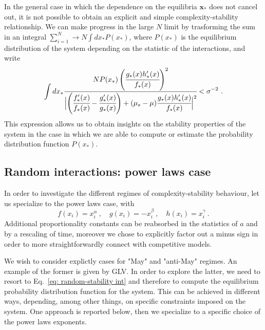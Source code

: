 \documentclass[
 reprint,
 amsmath,amssymb,
 aps,
]{revtex4-2}
\begin{document}
In the general case in which the dependence on the equilibria
$\mathbf{x}_*$ does not cancel out, it is not possible to
obtain an explicit and simple complexity-stability relationship.
We can make progress in the large $N$ limit by
trasforming the sum in an integral 
$\sum_{i=1}^N\to N\int dx_*P(x_*)$, where $P(x_*)$ 
is the equilibrium distribution of the system
depending on the statistic of the interactions,
and write
\begin{equation}\label{eq: random-stability int}
    \int dx_* \cfrac{NP(x_*) \left(\cfrac{g_*(x)h_*'(x)}{f_*(x)}\right)^2}{
        \Bigl |\left(\cfrac{f_*'(x)}{f_*(x)} -
        \cfrac{g_*'(x)}{g_*(x)}\right)
        +(\mu_s-\mu) \cfrac{g_*(x)h_*'(x)}{f_*(x)} \Bigl |^2}
    < \sigma^{-2} \ .
\end{equation}
This expression allows us to obtain insights on the stability properties of
the system in the case in which we are able to compute or estimate 
the probability distribution function $P(x_*)$.

\subsection{Random interactions: power laws case}
In order to investigate the different regimes
of complexity-stability behaviour,
let us specialize to the power laws case, with 
\begin{equation}
    f(x_i)=x_i^{\alpha} \ , \quad g(x_i)=-x_i^{\beta} \ , \quad h(x_i)=x_i^{\gamma} \ .
\end{equation} 
Additional proportionality constants can be reabsorbed in the statistics
of $a$ and by a rescaling of time, moreover we chose to explicitly
factor out a minus sign in order to more straightforwardly connect
with competitive models.

We wish to consider explictly cases
for "May" and "anti-May" regimes.
An example of the former is given by GLV.
In order to explore the latter, we 
need to resort to Eq.~\eqref{eq: random-stability int} and therefore
to compute the equilibrium probability distribution function
for the system. This can be achieved in different ways,
depending, among other things, on specific constraints 
imposed on the system. 
One approach is reported below, 
then we specialize to a specific choice of 
the power laws exponents.
\end{document}

